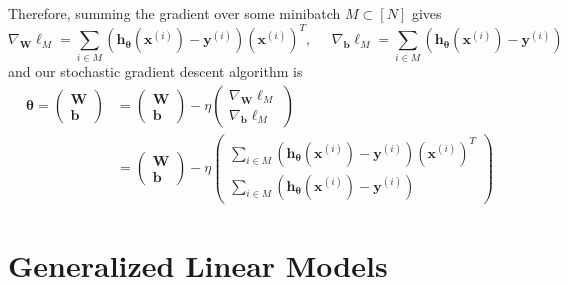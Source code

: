 \documentclass{article}
\theoremstyle{definition}
\theoremstyle{remark}
\theoremstyle{definition}
\begin{document}
Therefore, summing the gradient over some minibatch $M \subset [N]$ gives 
\[\nabla_{\mathbf{W}} \ell_M = \sum_{i \in M} (\mathbf{h}_{\boldsymbol{\theta}}(\mathbf{x}^{(i)}) - \mathbf{y}^{(i)}) (\mathbf{x}^{(i)})^T, \;\;\;\;\; \nabla_{\mathbf{b}} \ell_M = \sum_{i \in M} (\mathbf{h}_{\boldsymbol{\theta}}(\mathbf{x}^{(i)}) - \mathbf{y}^{(i)})\]
and our stochastic gradient descent algorithm is 
\begin{align*}
    \boldsymbol{\theta} = \begin{pmatrix} \mathbf{W} \\ \mathbf{b} \end{pmatrix} & = \begin{pmatrix} \mathbf{W} \\ \mathbf{b} \end{pmatrix} - \eta \begin{pmatrix} \nabla_{\mathbf{W}} \ell_M \\ \nabla_{\mathbf{b}} \ell_M \end{pmatrix} \\
    & = \begin{pmatrix} \mathbf{W} \\ \mathbf{b} \end{pmatrix} - \eta \begin{pmatrix} \sum_{i \in M} (\mathbf{h}_{\boldsymbol{\theta}}(\mathbf{x}^{(i)}) - \mathbf{y}^{(i)}) (\mathbf{x}^{(i)})^T \\ \sum_{i \in M} (\mathbf{h}_{\boldsymbol{\theta}}(\mathbf{x}^{(i)}) - \mathbf{y}^{(i)}) \end{pmatrix} 
\end{align*}

\section{Generalized Linear Models}
\end{document}
